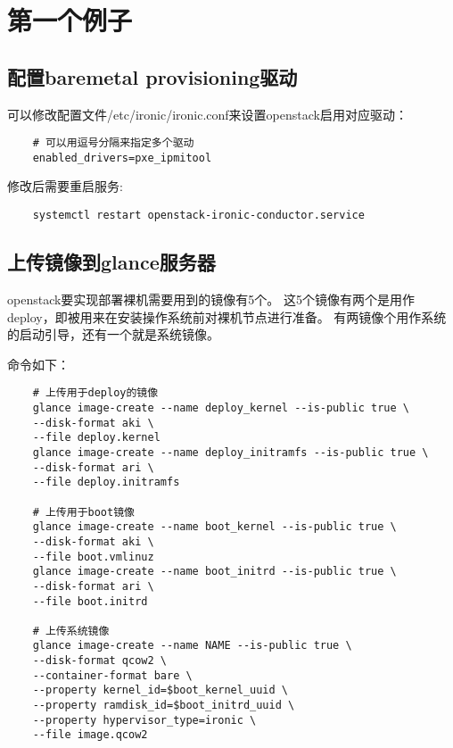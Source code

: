 \documentclass[a4paper,left=2.5cm,right=2.5cm,11pt]{article}
\begin{document}
\tableofcontents

\clearpage

\section{第一个例子}
\subsection{配置baremetal provisioning驱动}
	可以修改配置文件/etc/ironic/ironic.conf来设置openstack启用对应驱动：
	\begin{lstlisting}
	# 可以用逗号分隔来指定多个驱动
	enabled_drivers=pxe_ipmitool
	\end{lstlisting}

	修改后需要重启服务:
	\begin{lstlisting}
	systemctl restart openstack-ironic-conductor.service
	\end{lstlisting}

\subsection{上传镜像到glance服务器}
	openstack要实现部署裸机需要用到的镜像有5个。
	这5个镜像有两个是用作deploy，即被用来在安装操作系统前对裸机节点进行准备。
	有两镜像个用作系统的启动引导，还有一个就是系统镜像。\par

	命令如下：
	\begin{lstlisting}
	# 上传用于deploy的镜像
	glance image-create --name deploy_kernel --is-public true \
	--disk-format aki \
	--file deploy.kernel
	glance image-create --name deploy_initramfs --is-public true \
	--disk-format ari \
	--file deploy.initramfs

	# 上传用于boot镜像
	glance image-create --name boot_kernel --is-public true \
	--disk-format aki \
	--file boot.vmlinuz
	glance image-create --name boot_initrd --is-public true \
	--disk-format ari \
	--file boot.initrd

	# 上传系统镜像
	glance image-create --name NAME --is-public true \
	--disk-format qcow2 \
	--container-format bare \
	--property kernel_id=$boot_kernel_uuid \
	--property ramdisk_id=$boot_initrd_uuid \
	--property hypervisor_type=ironic \
	--file image.qcow2
	\end{lstlisting}
\end{document}
